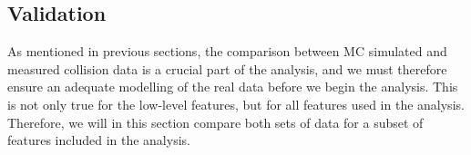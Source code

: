\subsection*{Validation}\label{subsec:Validation}
As mentioned in previous sections, the comparison between \ac{MC} simulated and measured collision data is a crucial part of the 
analysis, and we must therefore ensure an adequate modelling of the real data before we begin the analysis. This is not only 
true for the low-level features, but for all features used in the analysis. Therefore, 
we will in this section compare both sets of data for a subset of features included in the analysis.
\begin{figure}[H]
    \renewcommand\figurename{Table}
    \centering
\end{figure}
